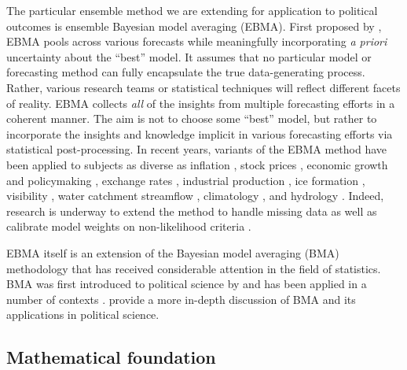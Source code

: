 \documentclass[12pt,fullpage]{article}
\begin{document}
The particular ensemble method we are extending for application to
political outcomes is ensemble Bayesian model averaging (EBMA). First
proposed by \citet{Raftery:2005}, EBMA pools across various forecasts
while meaningfully incorporating \textit{a priori} uncertainty about
the ``best'' model.  It assumes that no particular model or
forecasting method can fully encapsulate the true data-generating
process.  Rather, various research teams or statistical techniques
will reflect different facets of reality. EBMA collects \textit{all}
of the insights from multiple forecasting efforts in a coherent
manner.  The aim is not to choose some ``best'' model, but rather to
incorporate the insights and knowledge implicit in various forecasting
efforts via statistical post-processing.  In recent years, variants of
the EBMA method have been applied to subjects as diverse as inflation
\citep{Wright:2009, Koop:2010, Gneiting:2010}, stock prices
\citep{Billio:2011}, economic growth and policymaking
\citep{Brock:2007, Billio:2010}, exchange rates \citep{Wright:2008},
industrial production \citep{Feldkircher:2010}, ice formation
\citep{Berrocal:2010}, visibility \citep{Chmielecki:2010}, water
catchment streamflow \citep{Viney:2009}, climatology \citep{Min:2006,
  Min:2007, Smith:2009}, and hydrology \citep{Zhang:2009}.  Indeed,
research is underway to extend the method to handle missing data
\citep{Fraley:2010, Mccandless:2011} as well as calibrate model
weights on non-likelihood criteria \citep[e.g.,][]{Vrugt:2006}.

EBMA itself is an extension of the Bayesian model averaging (BMA)
methodology \citep[c.f.,][]{Madigan:1994, Draper:1995, Raftery:1995,
  Hoeting:1999, Clyde:2003, Raftery:2003, Clyde:2004} that has
received considerable attention in the field of statistics. BMA was
first introduced to political science by \citet{Bartels:1997} and has
been applied in a number of contexts \citep[e.g.,][]{Bartels:2001,
  Gill:2004, Imai:2004, Geer:2006b}. \citet{Montgomery:2010c} provide
a more in-depth discussion of BMA and its applications in political
science.



\subsection{Mathematical foundation}
\end{document}
